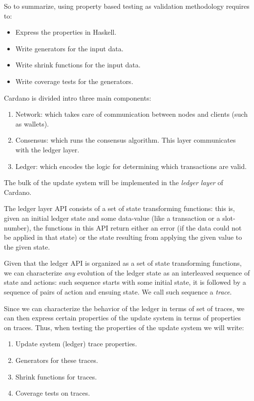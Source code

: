 So to summarize, using property based testing as validation methodology
requires to:

\begin{itemize}
	\item Express the properties in Haskell.
	\item Write generators for the input data.
	\item Write shrink functions for the input data.
	\item Write coverage tests for the generators.
\end{itemize}

%
Cardano is divided intro three main components:
\begin{enumerate}
	\item Network: which takes care of communication between nodes and clients
	(such as wallets).
	\item Consensus: which runs the consensus algorithm. This layer communicates
	with the ledger layer.
	\item Ledger: which encodes the logic for determining which transactions are
	valid.
\end{enumerate}

The bulk of the update system will be implemented in the \emph{ledger layer} of
Cardano.

The ledger layer API consists of a set of state transforming functions: this
is, given an initial ledger state and some data-value (like a transaction or a
slot-number), the functions in this API return either an error (if the data
could not be applied in that state) or the state resulting from applying the
given value to the given state.

Given that the ledger API is organized as a set of state transforming
functions, we can characterize \emph{any} evolution of the ledger state as an
interleaved sequence of state and actions: such sequence starts with some
initial state, it is followed by a sequence of pairs of action and ensuing
state. We call such sequence a \emph{trace}.

Since we can characterize the behavior of the ledger in terms of set of traces,
we can then express certain properties of the update system in terms of
properties on traces. Thus, when testing the properties of the update system we
will write:

\begin{enumerate}
	\item Update system (ledger) trace properties.
	\item Generators for these traces.
	\item Shrink functions for traces.
	\item Coverage tests on traces.
\end{enumerate}


